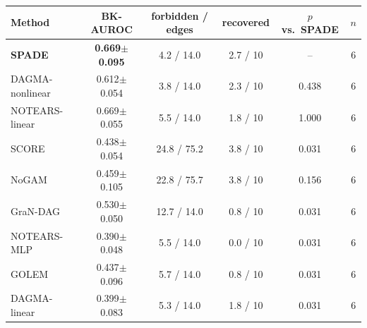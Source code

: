 \begin{tabular}{lccccc}
\toprule
Method & BK-AUROC & forbidden / edges & recovered & $p$ vs.\ SPADE & $n$ \\ \midrule
\textbf{SPADE} & \textbf{0.669$\pm$0.095} & 4.2 / 14.0 & 2.7 / 10 & -- & 6 \\
DAGMA-nonlinear & 0.612$\pm$0.054 & 3.8 / 14.0 & 2.3 / 10 & 0.438 & 6 \\
NOTEARS-linear & 0.669$\pm$0.055 & 5.5 / 14.0 & 1.8 / 10 & 1.000 & 6 \\
SCORE & 0.438$\pm$0.054 & 24.8 / 75.2 & 3.8 / 10 & 0.031 & 6 \\
NoGAM & 0.459$\pm$0.105 & 22.8 / 75.7 & 3.8 / 10 & 0.156 & 6 \\
GraN-DAG & 0.530$\pm$0.050 & 12.7 / 14.0 & 0.8 / 10 & 0.031 & 6 \\
NOTEARS-MLP & 0.390$\pm$0.048 & 5.5 / 14.0 & 0.0 / 10 & 0.031 & 6 \\
GOLEM & 0.437$\pm$0.096 & 5.7 / 14.0 & 0.8 / 10 & 0.031 & 6 \\
DAGMA-linear & 0.399$\pm$0.083 & 5.3 / 14.0 & 1.8 / 10 & 0.031 & 6 \\
\bottomrule
\end{tabular}
